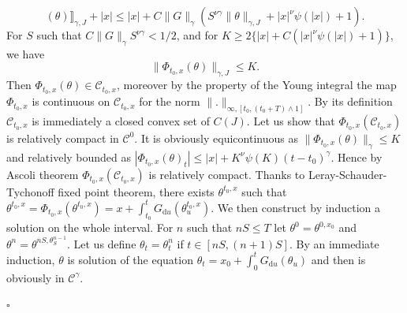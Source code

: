 \documentclass[a4paper,11pt]{article}
\newcommand{\mathd}{\mathrm{d}}
\newenvironment{proof}{{\sc Proof.}}{\hfill$\square$}
\newcommand{\CC}{\mathscr C}
\begin{document}
\begin{proof}
\[     ( \theta ) \rrbracket_{\gamma ,J} + | x | \leqslant | x | +C
     \|G\|_{\gamma} (S^{\nu \gamma} \| \theta \|_{\gamma ,J} +|x|^{\nu} \psi (
     | x | ) +1) . \]
  For $S$ such that $C \| G \|_{\gamma} S^{\nu \gamma} <1/2$, and for $K
  \geqslant 2 \{ | x | +C ( |x|^{\nu} \psi ( | x | ) +1 ) \}$, we have
  \[ \| \Phi_{t_{0} ,x} ( \theta ) \|_{\gamma ,J} \leqslant K. \]
  Then $\Phi_{t_{0} ,x} ( \theta ) \in \mathcal{C}_{t_{0} ,x}$, moreover by
  the property of the Young integral the map $\Phi_{t_{0} ,x}$ is continuous
  on $\mathcal{C}_{t_{0} ,x}$ for the norm $\|.\|_{\infty , [t_{0} ,(t_{0} +T)
  \wedge 1]}$. By its definition $\mathcal{C}_{t_{0} ,x}$ is immediately a
  closed convex set of $C ( J )$. Let us show that $\Phi_{t_{0} ,x} (
  \mathcal{C}_{t_{0} ,x} )$ is relatively compact in $\mathcal{C}^{0}$. It is
  obviously equicontinuous as $\| \Phi_{t_{0} ,x} ( \theta )\|_{\gamma}
  \leqslant K$ and relatively bounded as $| \Phi_{t_{0} ,x} ( \theta )_{t} |
  \leqslant |x| +K^{\nu} \psi ( K ) (t-t_{0} )^{\gamma}$. Hence by Ascoli
  theorem $\Phi_{t_{0} ,x} ( \mathcal{C}_{t_{0} ,x} )$ is relatively compact.
  Thanks to Leray-Schauder-Tychonoff fixed point theorem, there exists
  $\theta^{t_{0} ,x}$ such that $\theta^{t_{0} ,x} = \Phi_{t_{0} ,x} (
  \theta^{t_{0} ,x} ) =x+ \int_{t_{0}}^{t} G_{\mathd u} ( \theta^{t_{0}
  ,x}_{u} )$. We then construct by induction a solution on the whole interval.
  For $n$ such that $n S \leqslant T$ let $\theta^{0} = \theta^{0,x_{0}}$ and
  $\theta^{n} = \theta^{nS, \theta^{n-1}_{S}}$. Let us define $\theta_{t} =
  \theta^{n}_{t}$ if $t \in [nS,(n+1)S]$. By an immediate induction, $\theta$
  is solution of the equation $\theta_{t} =x_{0} + \int_{0}^{t} G_{\mathd u} (
  \theta_{u} )$ and then is obviously in $\CC^{\gamma}$.
  

\end{proof}
\end{document}
